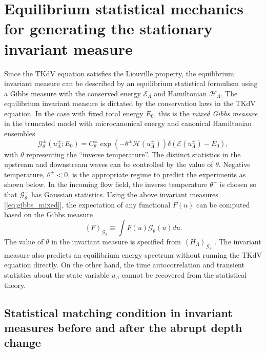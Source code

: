 \documentclass[9pt,twocolumn,twoside,lineno]{pnas-new}
\begin{document}
\section{Equilibrium statistical mechanics for generating the stationary invariant measure}

Since the TKdV equation satisfies the Liouville property, the equilibrium
invariant measure can be described by an equilibrium statistical formulism
\cite{abramov2003hamiltonian,majda2006nonlinear,bajars2013weakly}
using a Gibbs measure with the conserved energy $\mathcal{E}_{\Lambda}$ and
Hamiltonian $\mathcal{H}_{\Lambda}$. The equilibrium invariant measure is dictated
by the conservation laws in the TKdV equation. In the case with fixed
total energy $E_{0}$, this is the \emph{mixed Gibbs measure} in the
truncated model with microcanonical energy and canonical Hamiltonian
ensembles \cite{abramov2003hamiltonian}
\begin{equation}
\mathcal{G}_{\theta}^{\pm}\left(u_{\Lambda}^{\pm};E_{0}\right)=C_{\theta}^{\pm}\exp\left(-\theta^{\pm}\mathcal{H}\left(u_{\Lambda}^{\pm}\right)\right)\delta\left(\mathcal{E}\left(u_{\Lambda}^{\pm}\right)-E_{0}\right),\label{eq:gibbs_mixed}
\end{equation}
with $\theta$ representing the ``inverse temperature''. The distinct
statistics in the upstream and downstream waves can be controlled
by the value of $\theta$. Negative temperature, $\theta^{\pm}<0$, is the appropriate regime to predict the
experiments as shown below. In the incoming flow field, the inverse
temperature $\theta^{-}$ is chosen so that $\mathcal{G}_{\theta}^{-}$
has Gaussian statistics. Using the above invariant measures [\ref{eq:gibbs_mixed}],
the expectation of any functional $F\left(u\right)$ can be computed
based on the Gibbs measure 
\[
\left\langle F\right\rangle _{\mathcal{G}_{\theta}}\equiv\int F\left(u\right)\mathcal{G}_{\theta}\left(u\right)du.
\]
The value of $\theta$ in the invariant measure is specified from
$\left\langle H_{\Lambda}\right\rangle _{\mathcal{G}_{\theta}}$ \cite{abramov2003hamiltonian,bajars2013weakly}.
The invariant measure also predicts an equilibrium energy spectrum
without running the TKdV equation directly. On the other hand, the
time autocorrelation and transient statistics about the state variable
$u_{\Lambda}$ cannot be recovered from the statistical theory.

\subsection{Statistical matching condition in invariant measures before and after the abrupt depth change}
\end{document}

